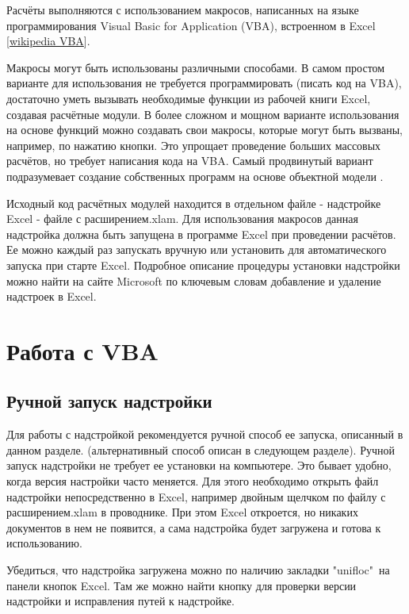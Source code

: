 Расчёты \unf{} выполняются с использованием макросов, написанных на языке программирования Visual Basic for Application (VBA), встроенном в Excel [\href{https://ru.wikipedia.org/wiki/Visual_Basic_for_Applications}{wikipedia VBA}]. 

Макросы \unf{} могут быть использованы различными способами. В самом простом варианте для использования \unf{} не требуется программировать (писать код на VBA), достаточно уметь вызывать необходимые функции из рабочей книги Excel, создавая расчётные модули. В более сложном и мощном варианте использования на основе функций \unf{} можно создавать свои макросы, которые могут быть вызваны, например, по нажатию кнопки. Это упрощает проведение больших массовых расчётов, но требует написания кода на VBA. Самый продвинутый вариант подразумевает создание собственных программ на основе объектной модели \unf{}. 


Исходный код расчётных модулей находится в отдельном файле - надстройке Excel - файле с расширением.xlam. Для использования макросов данная надстройка должна быть запущена в программе Excel при проведении расчётов. Ее можно каждый раз запускать вручную или установить для автоматического запуска при старте Excel. Подробное описание процедуры установки надстройки можно найти на сайте Microsoft по ключевым словам 
добавление и удаление надстроек в Excel.

\section{Работа с VBA}


\subsection{Ручной запуск надстройки}
Для работы с надстройкой рекомендуется ручной способ ее запуска, описанный в данном разделе. (альтернативный способ описан в следующем разделе).
Ручной запуск надстройки не требует ее установки на компьютере. Это бывает удобно, когда версия настройки часто меняется. Для этого необходимо открыть файл надстройки непосредственно в Excel, например двойным щелчком по файлу с расширением.xlam в проводнике. При этом Excel откроется, но никаких документов в нем не появится, а сама надстройка будет загружена и готова к использованию. 

Убедиться, что надстройка загружена можно по наличию закладки "unifloc"\ на панели кнопок Excel. Там же можно найти кнопку для проверки версии надстройки и исправления путей к надстройке. 

